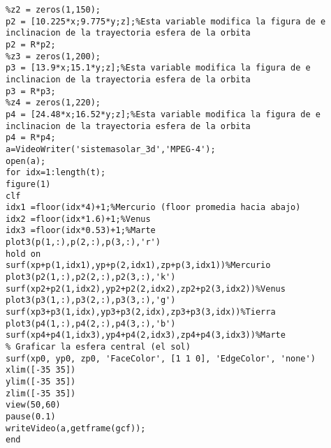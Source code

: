 \documentclass[12pt]{article}
\begin{document}
\begin{lstlisting}
%z2 = zeros(1,150);
p2 = [10.225*x;9.775*y;z];%Esta variable modifica la figura de e inclinacion de la trayectoria esfera de la orbita
p2 = R*p2;
%z3 = zeros(1,200);
p3 = [13.9*x;15.1*y;z];%Esta variable modifica la figura de e inclinacion de la trayectoria esfera de la orbita
p3 = R*p3;
%z4 = zeros(1,220);
p4 = [24.48*x;16.52*y;z];%Esta variable modifica la figura de e inclinacion de la trayectoria esfera de la orbita
p4 = R*p4;
a=VideoWriter('sistemasolar_3d','MPEG-4');
open(a);
for idx=1:length(t);
figure(1)
clf
idx1 =floor(idx*4)+1;%Mercurio (floor promedia hacia abajo)
idx2 =floor(idx*1.6)+1;%Venus
idx3 =floor(idx*0.53)+1;%Marte
plot3(p(1,:),p(2,:),p(3,:),'r')
hold on
surf(xp+p(1,idx1),yp+p(2,idx1),zp+p(3,idx1))%Mercurio
plot3(p2(1,:),p2(2,:),p2(3,:),'k')
surf(xp2+p2(1,idx2),yp2+p2(2,idx2),zp2+p2(3,idx2))%Venus
plot3(p3(1,:),p3(2,:),p3(3,:),'g')
surf(xp3+p3(1,idx),yp3+p3(2,idx),zp3+p3(3,idx))%Tierra
plot3(p4(1,:),p4(2,:),p4(3,:),'b')
surf(xp4+p4(1,idx3),yp4+p4(2,idx3),zp4+p4(3,idx3))%Marte
% Graficar la esfera central (el sol)
surf(xp0, yp0, zp0, 'FaceColor', [1 1 0], 'EdgeColor', 'none')
xlim([-35 35])
ylim([-35 35])
zlim([-35 35])
view(50,60)
pause(0.1)
writeVideo(a,getframe(gcf));
end
	
	\end{lstlisting}
	
\end{document}
